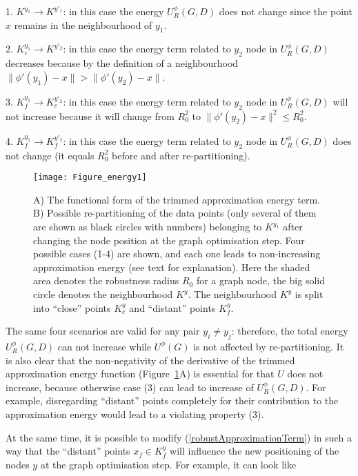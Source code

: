 \documentclass[graybox]{archivesofdatascience}
\begin{document}
1. $K^{y_1}\rightarrow K^{y'_1}$: in this case the energy $U^{\phi}_R(G,D)$ does not change since the point $x$ remains in the neighbourhood of $y_1$.

2. $K_c^{y_1}\rightarrow K^{y'_2}$: in this case the energy term related to $y_2$ node in $U^{\phi}_R(G,D)$ decreases because by the definition of a neighbourhood $\|\phi'(y_1)-x\|>\|\phi'(y_2)-x\|$.

3. $K_f^{y_1}\rightarrow K_c^{y'_2}$: in this case the energy term related to $y_2$ node in $U^{\phi}_R(G,D)$ will not increase because it will change from $R_0^2$ to $\|\phi'(y_2)-x\|^2 \leq R_0^2$.

4. $K_f^{y_1}\rightarrow K_f^{y'_2}$: in this case the energy term related to $y_2$ node in $U^{\phi}_R(G,D)$  does not change (it equals $R_0^2$ before and after re-partitioning).

\begin{figure}[tbp]
\texttt{[image: Figure\_energy1]}
\caption{A) The functional form of the trimmed approximation energy term. B) Possible re-partitioning of the data points (only several of them are shown as black circles with numbers) belonging to $K^{y_1}$ after changing the node position at the graph optimisation step. Four possible cases (1-4) are shown, and each one leads to non-increasing approximation energy (see text for explanation). Here the shaded area denotes the robustness radius $R_0$ for a graph node, the big solid circle denotes the neighbourhood $K^{y}$. The neighbourhood $K^{y}$ is split into ``close'' points $K_c^{y}$ and ``distant'' points $K_f^{y}$. }
\label{FIGUREENERGY}       \end{figure}

The same four scenarios are valid for any pair $y_i\neq y_j$: therefore, the total energy $U^{\phi}_R(G,D)$ can not increase while $U^{\phi}{(G)}$ is not affected by re-partitioning. It is also clear that the non-negativity of the derivative of the trimmed approximation energy function (Figure~\ref{FIGUREENERGY}A) is essential for that $U$ does not increase, because otherwise case (3) can lead to increase of $U^{\phi}_R(G,D)$. For example, disregarding ``distant'' points completely for their contribution to the approximation energy would lead to a violating property (3).

\iffalse
At the same time, it is possible to modify (\ref{robustApproximationTerm}) in such a way that the ``distant'' points $x_f\in K^y_f$ will influence the new positioning of the nodes $y$ at the graph optimisation step. For example, it can look like
\end{document}
